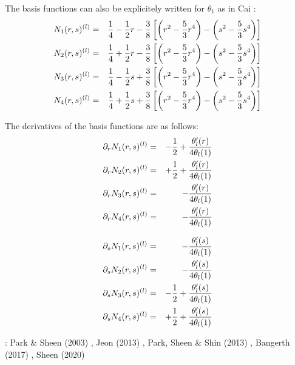 The basis functions can also be explicitely written for $\theta_1$ as in Cai \etal \cite{cady99}:
\begin{eqnarray}
N_1(r,s)^{(l)} 
&=& \frac{1}{4} - \frac{1}{2} r - \frac38 \left[\left( r^2-\frac53r^4 \right) - \left(s^2-\frac53s^4 \right) \right] \nonumber\\
N_2(r,s)^{(l)} 
&=& \frac{1}{4} + \frac{1}{2} r - \frac38 \left[\left( r^2-\frac53r^4 \right) - \left(s^2-\frac53s^4 \right) \right] \nonumber\\
N_3(r,s)^{(l)} 
&=& \frac{1}{4} - \frac{1}{2} s + \frac38 \left[\left( r^2-\frac53r^4 \right) - \left(s^2-\frac53s^4 \right) \right] \nonumber\\
N_4(r,s)^{(l)} 
&=& \frac{1}{4} + \frac{1}{2} s + \frac38 \left[\left( r^2-\frac53r^4 \right) - \left(s^2-\frac53s^4 \right) \right] 
\end{eqnarray}

The derivatives of the basis functions are as follows:
\begin{eqnarray}
\partial_r N_1(r,s)^{(l)} &=&  - \frac{1}{2}  + \frac{\theta_l'(r)}{4 \theta_l(1)}  \nonumber\\
\partial_r N_2(r,s)^{(l)} &=&  + \frac{1}{2}  + \frac{\theta_l'(r)}{4 \theta_l(1)}  \nonumber\\
\partial_r N_3(r,s)^{(l)} &=&  - \frac{\theta_l'(r)}{4 \theta_l(1)}  \nonumber\\
\partial_r N_4(r,s)^{(l)} &=&  - \frac{\theta_l'(r)}{4 \theta_l(1)}  
\end{eqnarray}

\begin{eqnarray}
\partial_s N_1(r,s)^{(l)} &=&   -\frac{\theta_l'(s)}{4 \theta_l(1)}  \nonumber\\
\partial_s N_2(r,s)^{(l)} &=&   -\frac{\theta_l'(s)}{4 \theta_l(1)}  \nonumber\\
\partial_s N_3(r,s)^{(l)} &=&   - \frac{1}{2} + \frac{\theta_l'(s)}{4 \theta_l(1)}  \nonumber\\
\partial_s N_4(r,s)^{(l)} &=&   + \frac{1}{2} + \frac{\theta_l'(s)}{4 \theta_l(1)}  
\end{eqnarray}





\Literature: 
Park \& Sheen (2003) \cite{pash03},
Jeon \etal (2013) \cite{jens13},
Park, Sheen \& Shin (2013) \cite{pass13},
Bangerth \etal (2017) \cite{baks17},
Sheen (2020) \cite{shee20}
